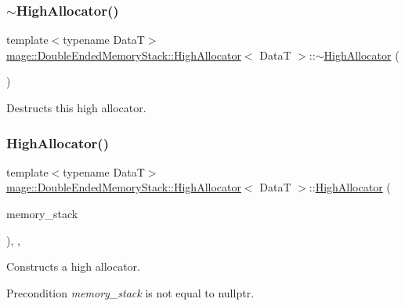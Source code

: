 \subsubsection{\texorpdfstring{$\sim$\+High\+Allocator()}{~HighAllocator()}}
{\footnotesize\ttfamily template$<$typename DataT$>$ \\
\hyperlink{structmage_1_1_double_ended_memory_stack_1_1_high_allocator}{mage\+::\+Double\+Ended\+Memory\+Stack\+::\+High\+Allocator}$<$ DataT $>$\+::$\sim$\hyperlink{structmage_1_1_double_ended_memory_stack_1_1_high_allocator}{High\+Allocator} (\begin{DoxyParamCaption}{ }\end{DoxyParamCaption})\hspace{0.3cm}{\ttfamily [default]}}

Destructs this high allocator. \hypertarget{structmage_1_1_double_ended_memory_stack_1_1_high_allocator_a6d51325f813c70290379dcb472d093c3}{}\label{structmage_1_1_double_ended_memory_stack_1_1_high_allocator_a6d51325f813c70290379dcb472d093c3} 
\subsubsection{\texorpdfstring{High\+Allocator()}{HighAllocator()}\hspace{0.1cm}{\footnotesize\ttfamily [4/4]}}
{\footnotesize\ttfamily template$<$typename DataT$>$ \\
\hyperlink{structmage_1_1_double_ended_memory_stack_1_1_high_allocator}{mage\+::\+Double\+Ended\+Memory\+Stack\+::\+High\+Allocator}$<$ DataT $>$\+::\hyperlink{structmage_1_1_double_ended_memory_stack_1_1_high_allocator}{High\+Allocator} (\begin{DoxyParamCaption}\item[{\hyperlink{classmage_1_1_double_ended_memory_stack}{Double\+Ended\+Memory\+Stack} $\ast$}]{memory\+\_\+stack }\end{DoxyParamCaption})\hspace{0.3cm}{\ttfamily [explicit]}, {\ttfamily [private]}, {\ttfamily [noexcept]}}

Constructs a high allocator.

\begin{DoxyPrecond}{Precondition}
{\itshape memory\+\_\+stack} is not equal to {\ttfamily nullptr}. 
\end{DoxyPrecond}

